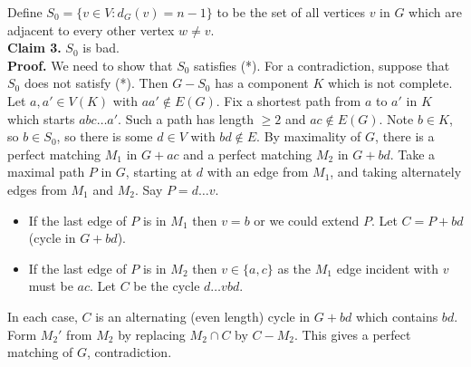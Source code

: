 \begin{theorem}[Tutte, 1947]
{    Define \(S_0 = \{ v \in V : d_G(v) = n - 1 \}\) to be the set of all vertices \(v\) in \(G\) which are adjacent to every other vertex \(w \neq v\). \\

    {\bf Claim 3.} \(S_0\) is bad. \\
    {\bf Proof.} We need to show that \(S_0\) satisfies (*). For a contradiction, suppose that \(S_0\) does not satisfy (*). Then \(G - S_0\) has a component \(K\) which is not complete. Let \(a, a' \in V(K)\) with \(aa' \notin E(G)\). Fix a shortest path from \(a\) to \(a'\) in \(K\) which starts \(abc \dots a'\). Such a path has length \(\geq 2\) and \(ac \notin E(G)\). Note \(b \in K\), so \(b \in S_0\), so there is some \(d \in V\) with \(bd \notin E\). By maximality of \(G\), there is a perfect matching \(M_1\) in \(G + ac\) and a perfect matching \(M_2\) in \(G + bd\). Take a maximal path \(P\) in \(G\), starting at \(d\) with an edge from \(M_1\), and taking alternately edges from \(M_1\) and \(M_2\). Say \(P = d \dots v\).
    \begin{itemize}
        \item If the last edge of \(P\) is in \(M_1\) then \(v = b\) or we could extend \(P\). Let \(C = P + bd\) (cycle in \(G + bd\)).
        \item If the last edge of \(P\) is in \(M_2\) then \(v \in \{a, c \}\) as the \(M_1\) edge incident with \(v\) must be \(ac\).  Let \(C\) be the cycle \(d \dots vbd \).
    \end{itemize}

    In each case, \(C\) is an alternating (even length) cycle in \(G + bd\) which contains \(bd\). Form \(M_2'\) from \(M_2\) by replacing \(M_2 \cap C\) by \(C-M_2\). This gives a perfect matching of \(G\), contradiction.
    }
\end{theorem}

